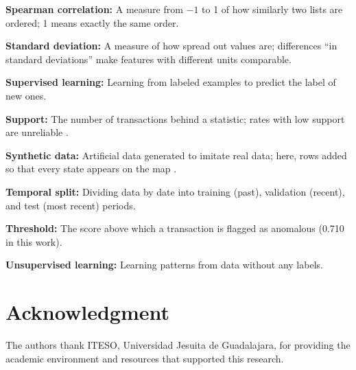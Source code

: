 \documentclass[journal]{IEEEtran}
\begin{document}
\textbf{Spearman correlation:} A measure from $-1$ to 1 of how similarly two lists are ordered; 1 means exactly the same order.

\textbf{Standard deviation:} A measure of how spread out values are; differences ``in standard deviations'' make features with different units comparable.

\textbf{Supervised learning:} Learning from labeled examples to predict the label of new ones.

\textbf{Support:} The number of transactions behind a statistic; rates with low support are unreliable \cite{wainer2007dangerous}.

\textbf{Synthetic data:} Artificial data generated to imitate real data; here, rows added so that every state appears on the map \cite{jordon2022synthetic}.

\textbf{Temporal split:} Dividing data by date into training (past), validation (recent), and test (most recent) periods.

\textbf{Threshold:} The score above which a transaction is flagged as anomalous (0.710 in this work).

\textbf{Unsupervised learning:} Learning patterns from data without any labels.

\endgroup


\section*{Acknowledgment}

The authors thank ITESO, Universidad Jesuita de Guadalajara, for providing the academic environment and resources that supported this research.


\printbibliography
\end{document}
